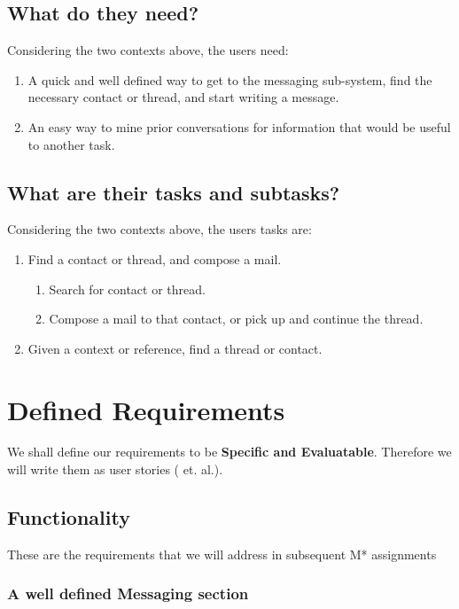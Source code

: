 \documentclass[
	letterpaper, %
]{jdf}
\begin{document}
\subsection{What do they need?}
Considering the two contexts above, the users need:
\begin{enumerate}
    \item A quick and well defined way to get to the messaging sub-system, find the necessary contact or thread, and start writing a message.
    \item An easy way to mine prior conversations for information that would be useful to another task.
\end{enumerate}


\subsection{What are their tasks and subtasks?}
Considering the two contexts above, the users tasks are:
\begin{enumerate}
    \item Find a contact or thread, and compose a mail.
    \begin{enumerate}
        \item Search for contact or thread.
        \item Compose a mail to that contact, or pick up and continue the thread.
    \end{enumerate}
    \item Given a context or reference, find a thread or contact.

\end{enumerate}

\section{Defined Requirements}
We shall define our requirements to be \textbf{Specific and Evaluatable}. Therefore we will write them as user stories (\cite{cohn} et. al.).

\subsection{Functionality}
These are the requirements that we will address in subsequent M* assignments
\subsubsection{A well defined Messaging section}
\end{document}
